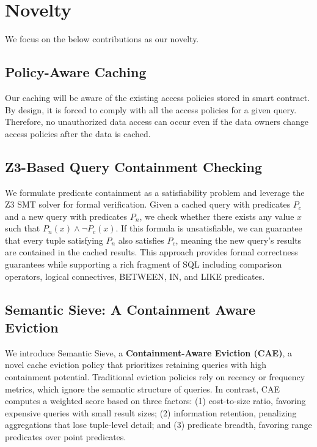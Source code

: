 \documentclass[12pt]{article}
\begin{document}
\section{Novelty}

We focus on the below contributions as our novelty. 

\subsection{Policy-Aware Caching}

Our caching will be aware of the existing access policies stored in smart contract. By design, it is forced to comply with all the access policies for a given query. Therefore, no unauthorized data access can occur even if the data owners change access policies after the data is cached.

\subsection{Z3-Based Query Containment Checking}

We formulate predicate containment as a satisfiability problem and leverage the Z3 SMT solver for formal verification. Given a cached query with predicates $P_c$ and a new query with predicates $P_n$, we check whether there exists any value $x$ such that $P_n(x) \land \neg P_c(x)$. If this formula is unsatisfiable, we can guarantee that every tuple satisfying $P_n$ also satisfies $P_c$, meaning the new query's results are contained in the cached results. This approach provides formal correctness guarantees while supporting a rich fragment of SQL including comparison operators, logical connectives, BETWEEN, IN, and LIKE predicates.

\subsection{Semantic Sieve: A Containment Aware Eviction}

We introduce Semantic Sieve, a \textbf{Containment-Aware Eviction (CAE)}, a novel cache eviction policy that prioritizes retaining queries with high containment potential. Traditional eviction policies rely on recency or frequency metrics, which ignore the semantic structure of queries. In contrast, CAE computes a weighted score based on three factors: (1) cost-to-size ratio, favoring expensive queries with small result sizes; (2) information retention, penalizing aggregations that lose tuple-level detail; and (3) predicate breadth, favoring range predicates over point predicates.
\end{document}
